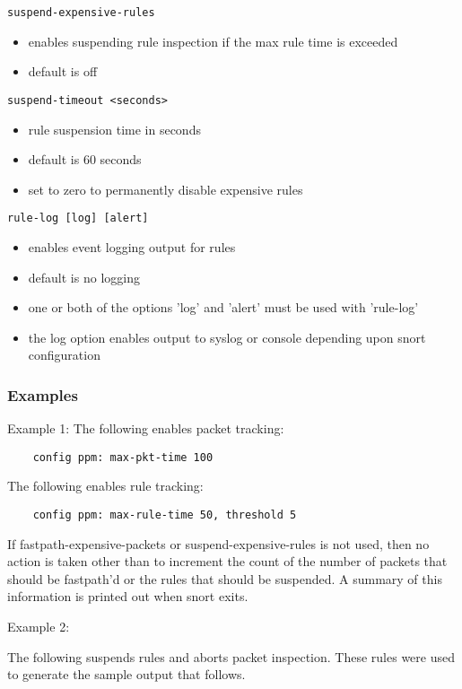 \documentclass[english]{report}
\begin{document}
\texttt{suspend-expensive-rules}
\begin{itemize}
\item enables suspending rule inspection if the max rule time is exceeded
\item default is off
\end{itemize}

\texttt{suspend-timeout <seconds>}
\begin{itemize}
\item rule suspension time in seconds
\item default is 60 seconds
\item set to zero to permanently disable expensive rules
\end{itemize}

\texttt{rule-log [log] [alert]}
\begin{itemize}
\item enables event logging output for rules
\item default is no logging
\item one or both of the options 'log' and 'alert' must be used with
      'rule-log'
\item the log option enables output to syslog or console depending 
      upon snort configuration
\end{itemize}

\subsubsection{Examples}

Example 1:
The following enables packet tracking:

\begin{verbatim}
    config ppm: max-pkt-time 100
\end{verbatim}

The following enables rule tracking:

\begin{verbatim}
    config ppm: max-rule-time 50, threshold 5
\end{verbatim}

If fastpath-expensive-packets or suspend-expensive-rules is not used, then
no action is taken other than to increment the count of the number of
packets that should be fastpath'd or the rules that should be suspended. A
summary of this information is printed out when snort exits.

Example 2:

The following suspends rules and aborts packet inspection.  These rules were
used to generate the sample output that follows.
\end{document}

